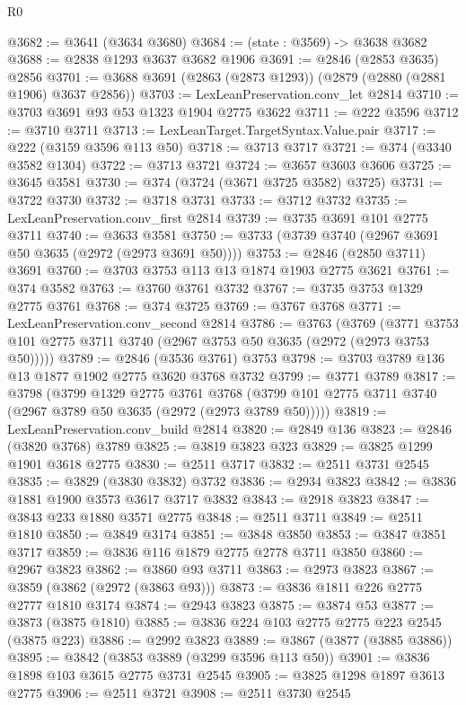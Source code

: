 \begin{lexlean}{R0}
\begin{coremodule}
@3682 := @3641 (@3634 @3680)
@3684 := (state : @3569) -> @3638 @3682
@3688 := @2838 @1293 @3637 @3682 @1906
@3691 := @2846 (@2853 @3635) @2856
@3701 := @3688 @3691 (@2863 (@2873 @1293)) (@2879 (@2880 (@2881 @1906) @3637 @2856))
@3703 := LexLeanPreservation.conv_let @2814
@3710 := @3703 @3691 @93 @53 @1323 @1904 @2775 @3622
@3711 := @222 @3596
@3712 := @3710 @3711
@3713 := LexLeanTarget.TargetSyntax.Value.pair
@3717 := @222 (@3159 @3596 @113 @50)
@3718 := @3713 @3717
@3721 := @374 (@3340 @3582 @1304)
@3722 := @3713 @3721
@3724 := @3657 @3603 @3606
@3725 := @3645 @3581
@3730 := @374 (@3724 (@3671 @3725 @3582) @3725)
@3731 := @3722 @3730
@3732 := @3718 @3731
@3733 := @3712 @3732
@3735 := LexLeanPreservation.conv_first @2814
@3739 := @3735 @3691 @101 @2775 @3711
@3740 := @3633 @3581
@3750 := @3733 (@3739 @3740 (@2967 @3691 @50 @3635 (@2972 (@2973 @3691 @50))))
@3753 := @2846 (@2850 @3711) @3691
@3760 := @3703 @3753 @113 @13 @1874 @1903 @2775 @3621
@3761 := @374 @3582
@3763 := @3760 @3761 @3732
@3767 := @3735 @3753 @1329 @2775 @3761
@3768 := @374 @3725
@3769 := @3767 @3768
@3771 := LexLeanPreservation.conv_second @2814
@3786 := @3763
    (@3769 (@3771 @3753 @101 @2775 @3711 @3740 (@2967 @3753 @50 @3635 (@2972 (@2973 @3753 @50)))))
@3789 := @2846 (@3536 @3761) @3753
@3798 := @3703 @3789 @136 @13 @1877 @1902 @2775 @3620 @3768 @3732
@3799 := @3771 @3789
@3817 := @3798
    (@3799
      @1329
      @2775
      @3761
      @3768
      (@3799 @101 @2775 @3711 @3740 (@2967 @3789 @50 @3635 (@2972 (@2973 @3789 @50)))))
@3819 := LexLeanPreservation.conv_build @2814
@3820 := @2849 @136
@3823 := @2846 (@3820 @3768) @3789
@3825 := @3819 @3823 @323
@3829 := @3825 @1299 @1901 @3618 @2775
@3830 := @2511 @3717
@3832 := @2511 @3731 @2545
@3835 := @3829 (@3830 @3832) @3732
@3836 := @2934 @3823
@3842 := @3836 @1881 @1900 @3573 @3617 @3717 @3832
@3843 := @2918 @3823
@3847 := @3843 @233 @1880 @3571 @2775
@3848 := @2511 @3711
@3849 := @2511 @1810
@3850 := @3849 @3174
@3851 := @3848 @3850
@3853 := @3847 @3851 @3717
@3859 := @3836 @116 @1879 @2775 @2778 @3711 @3850
@3860 := @2967 @3823
@3862 := @3860 @93 @3711
@3863 := @2973 @3823
@3867 := @3859 (@3862 (@2972 (@3863 @93)))
@3873 := @3836 @1811 @226 @2775 @2777 @1810 @3174
@3874 := @2943 @3823
@3875 := @3874 @53
@3877 := @3873 (@3875 @1810)
@3885 := @3836 @224 @103 @2775 @2775 @223 @2545 (@3875 @223)
@3886 := @2992 @3823
@3889 := @3867 (@3877 (@3885 @3886))
@3895 := @3842 (@3853 @3889 (@3299 @3596 @113 @50))
@3901 := @3836 @1898 @103 @3615 @2775 @3731 @2545
@3905 := @3825 @1298 @1897 @3613 @2775
@3906 := @2511 @3721
@3908 := @2511 @3730 @2545

\end{coremodule}
\end{lexlean}
